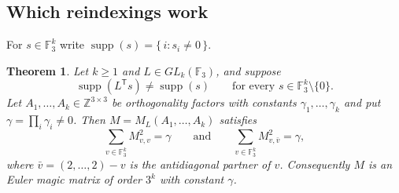 \documentclass[11pt,a4paper]{amsart}
\theoremstyle{plain}
\newtheorem{theorem}{Theorem}[section]
\theoremstyle{definition}
\theoremstyle{remark}
\newcommand{\FF}{\mathbb{F}}
\newcommand{\ZZ}{\mathbb{Z}}
\newcommand{\supp}{\operatorname{supp}}
\newcommand{\tr}{\mathsf{T}}
\begin{document}
\subsection{Which reindexings work}

For $s\in\FF_3^k$ write $\supp(s)=\{\,i : s_i\ne0\,\}$.

\begin{theorem}\label{thm:criterion}
Let $k\ge1$ and $L\in GL_k(\FF_3)$, and suppose
\begin{equation}\tag{$\star$}\label{eq:star}
\supp(L^{\tr}s)\ne\supp(s)\qquad\text{for every } s\in\FF_3^k\setminus\{0\}.
\end{equation}
Let $A_1,\dots,A_k\in\ZZ^{3\times3}$ be orthogonality factors with constants
$\gamma_1,\dots,\gamma_k$ and put $\gamma=\prod_i\gamma_i\ne0$. Then
$M=M_L(A_1,\dots,A_k)$ satisfies
\[
\sum_{v\in\FF_3^k} M_{v,v}^{2}=\gamma
\qquad\text{and}\qquad
\sum_{v\in\FF_3^k} M_{v,\bar v}^{2}=\gamma ,
\]
where $\bar v=(2,\dots,2)-v$ is the antidiagonal partner of $v$. Consequently
$M$ is an Euler magic matrix of order $3^k$ with constant $\gamma$.
\end{theorem}
\end{document}
